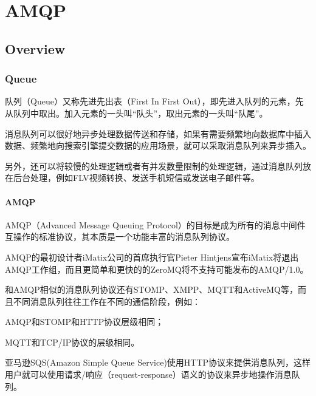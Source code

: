 \part{AMQP}


\chapter{Overview}

\section{Queue}

队列（Queue）又称先进先出表（First In First Out），即先进入队列的元素，先从队列中取出。加入元素的一头叫“队头”，取出元素的一头叫“队尾”。



消息队列可以很好地异步处理数据传送和存储，如果有需要频繁地向数据库中插入数据、频繁地向搜索引擎提交数据的应用场景，就可以采取消息队列来异步插入。



另外，还可以将较慢的处理逻辑或者有并发数量限制的处理逻辑，通过消息队列放在后台处理，例如FLV视频转换、发送手机短信或发送电子邮件等。




\subsection{AMQP}



AMQP（Advanced Message Queuing Protocol）的目标是成为所有的消息中间件互操作的标准协议，其本质是一个功能丰富的消息队列协议。






AMQP的最初设计者iMatix公司的首席执行官Pieter Hintjens宣布iMatix将退出AMQP工作组，而且更简单和更快的的ZeroMQ将不支持可能发布的AMQP/1.0。


和AMQP相似的消息队列协议还有STOMP、XMPP、MQTT和ActiveMQ等，而且不同消息队列往往工作在不同的通信阶段，例如：

\begin{compactitem}
\item AMQP和STOMP和HTTP协议层级相同；
\item MQTT和TCP/IP协议的层级相同。
\end{compactitem}


亚马逊SQS(Amazon Simple Queue Service)使用HTTP协议来提供消息队列，这样用户就可以使用请求/响应（request-response）语义的协议来异步地操作消息队列。





